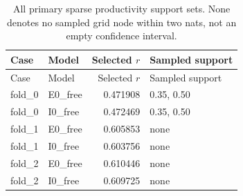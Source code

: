 {\small
\setlength{\tabcolsep}{3pt}
\begin{longtable}{llrl}
\caption{All primary sparse productivity support sets. None denotes no sampled grid node within two nats, not an empty confidence interval.}\label{tab:a2-profile-support}\\
\toprule
Case & Model & Selected $r$ & Sampled support\\\midrule
\endfirsthead
\toprule
Case & Model & Selected $r$ & Sampled support\\\midrule
\endhead
fold\_0 & E0\_free & 0.471908 & 0.35, 0.50\\
fold\_0 & I0\_free & 0.472469 & 0.35, 0.50\\
fold\_1 & E0\_free & 0.605853 & none\\
fold\_1 & I0\_free & 0.603756 & none\\
fold\_2 & E0\_free & 0.610446 & none\\
fold\_2 & I0\_free & 0.609725 & none\\
\bottomrule
\end{longtable}
}


